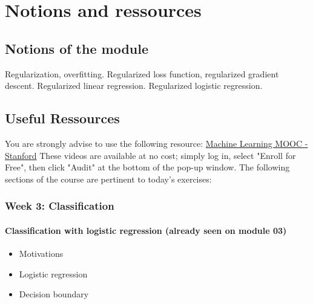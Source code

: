 

\chapter*{Notions and ressources}

\section*{Notions of the module}
Regularization, overfitting. Regularized loss function, regularized gradient descent.  
Regularized linear regression. Regularized logistic regression.

\section*{Useful Ressources}

You are strongly advise to use the following resource:
\href{https://www.coursera.org/learn/machine-learning}{Machine Learning MOOC - Stanford}
These videos are available at no cost; simply log in, select "Enroll for Free", then click "Audit" at the bottom of the pop-up window.
The following sections of the course are pertinent to today's exercises: 

\newpage

\subsection*{Week 3: Classification}

\subsubsection*{Classification with logistic regression (already seen on module 03)}
\begin{itemize}
  \item Motivations
  \item Logistic regression
  \item Decision boundary
\end{itemize}

